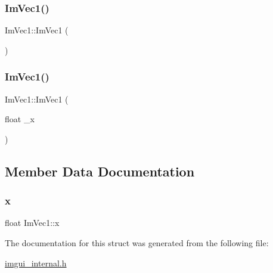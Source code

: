 \subsubsection{\texorpdfstring{Im\+Vec1()}{ImVec1()}\hspace{0.1cm}{\footnotesize\ttfamily [1/2]}}
{\footnotesize\ttfamily Im\+Vec1\+::\+Im\+Vec1 (\begin{DoxyParamCaption}{ }\end{DoxyParamCaption})\hspace{0.3cm}{\ttfamily [inline]}}

\mbox{\label{struct_im_vec1_aa17cbbe4525aa75d2ca65316fb2c0df9}} 
\subsubsection{\texorpdfstring{Im\+Vec1()}{ImVec1()}\hspace{0.1cm}{\footnotesize\ttfamily [2/2]}}
{\footnotesize\ttfamily Im\+Vec1\+::\+Im\+Vec1 (\begin{DoxyParamCaption}\item[{float}]{\+\_\+x }\end{DoxyParamCaption})\hspace{0.3cm}{\ttfamily [inline]}}



\subsection{Member Data Documentation}
\mbox{\label{struct_im_vec1_a825500197aa4fe7c4aa563ae547fd29b}} 
\subsubsection{\texorpdfstring{x}{x}}
{\footnotesize\ttfamily float Im\+Vec1\+::x}



The documentation for this struct was generated from the following file\+:\begin{DoxyCompactItemize}
\item 
\mbox{\hyperlink{imgui__internal_8h}{imgui\+\_\+internal.\+h}}\end{DoxyCompactItemize}
